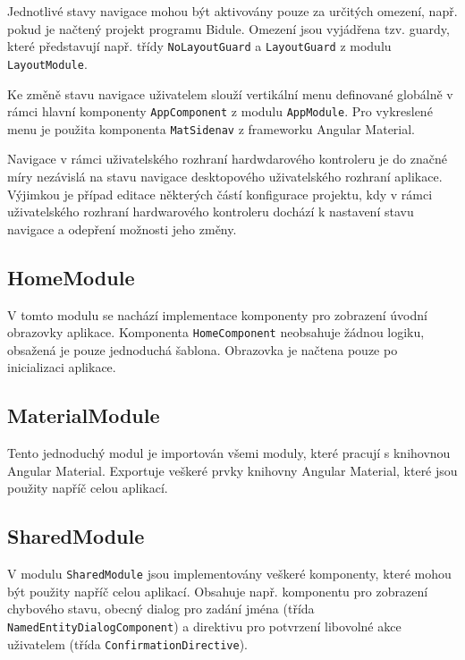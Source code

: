 \documentclass[thesis=M,czech]{FITthesis}[2019/03/06]
\begin{document}
			Jednotlivé stavy navigace mohou být aktivovány pouze za určitých omezení, např. pokud je načtený projekt programu Bidule. 
			Omezení jsou vyjádřena tzv. guardy, které představují např. třídy \texttt{NoLayoutGuard} a \texttt{LayoutGuard} z modulu \texttt{LayoutModule}.
			
			Ke změně stavu navigace uživatelem slouží vertikální menu definované globálně v rámci hlavní komponenty \texttt{AppComponent} z modulu \texttt{AppModule}. Pro vykreslené menu je použita komponenta \texttt{MatSidenav} z frameworku Angular Material.
			
			Navigace v rámci uživatelského rozhraní hardwdarového kontroleru je do značné míry nezávislá na stavu navigace desktopového uživatelského rozhraní aplikace.
			Výjimkou je případ editace některých částí konfigurace projektu, kdy v rámci uživatelského rozhraní hardwarového kontroleru dochází k nastavení stavu navigace a odepření možnosti jeho změny.
			
		\subsection{HomeModule}
			V tomto modulu se nachází implementace komponenty pro zobrazení úvodní obrazovky aplikace. Komponenta \texttt{HomeComponent}
			neobsahuje žádnou logiku, obsažená je pouze jednoduchá šablona. Obrazovka je načtena pouze po inicializaci aplikace.
			
		\subsection{MaterialModule}
			Tento jednoduchý modul je importován všemi moduly, které pracují s knihovnou Angular Material.
			Exportuje veškeré prvky knihovny Angular Material, které jsou použity napříč celou aplikací.
			
		\subsection{SharedModule}
			V modulu \texttt{SharedModule} jsou implementovány veškeré komponenty, které mohou být použity napříč celou aplikací.
			Obsahuje např. komponentu pro zobrazení chybového stavu, obecný dialog pro zadání jména (třída \texttt{Named\-Entity\-Dialog\-Component}) a direktivu pro potvrzení libovolné akce uživatelem (třída \texttt{Confirmation\-Directive}).
			
\end{document}
